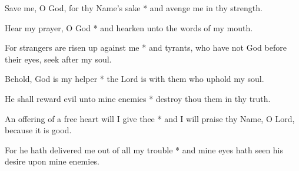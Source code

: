 Save me, O God, for thy Name's sake * and avenge me in thy strength.

Hear my prayer, O God * and hearken unto the words of my mouth.

For strangers are risen up against me * and tyrants, who have not God before their eyes, seek after my soul.

Behold, God is my helper * the Lord is with them who uphold my soul.

He shall reward evil unto mine enemies * destroy thou them in thy truth.

An offering of a free heart will I give thee * and I will praise thy Name, O Lord, because it is good.

For he hath delivered me out of all my trouble * and mine eyes hath seen his desire upon mine enemies.